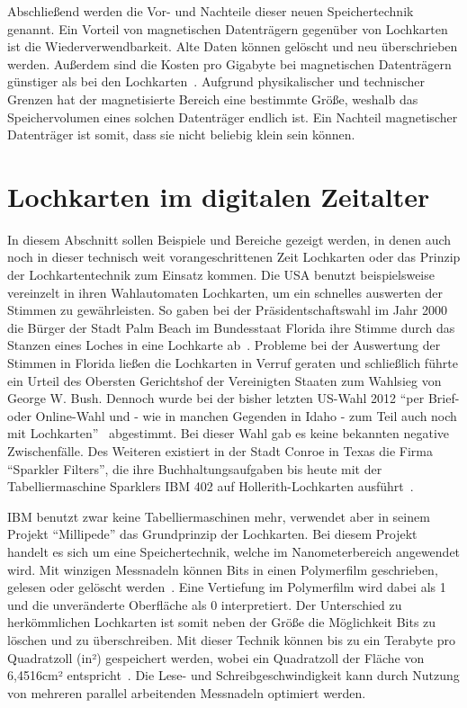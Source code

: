\documentclass[parskip=half]{scrartcl}
\begin{document}
Abschließend werden die Vor- und Nachteile dieser neuen Speichertechnik
genannt. Ein Vorteil von magnetischen Datenträgern gegenüber von Lochkarten ist
die Wiederverwendbarkeit. Alte Daten können gelöscht und neu überschrieben
werden. Außerdem sind die Kosten pro Gigabyte bei magnetischen Datenträgern
günstiger als bei den Lochkarten~\cite{Dee}. Aufgrund physikalischer und
technischer Grenzen hat der magnetisierte Bereich eine bestimmte Größe, weshalb
das Speichervolumen eines solchen Datenträger endlich ist. Ein Nachteil
magnetischer Datenträger ist somit, dass sie nicht beliebig klein sein können.

\section{Lochkarten im digitalen Zeitalter}

In diesem Abschnitt sollen Beispiele und Bereiche gezeigt werden, in denen auch
noch in dieser technisch weit vorangeschrittenen Zeit Lochkarten oder das
Prinzip der Lochkartentechnik zum Einsatz kommen. Die USA benutzt
beispielsweise vereinzelt in ihren Wahlautomaten Lochkarten, um ein schnelles
auswerten der Stimmen zu gewährleisten. So gaben bei der Präsidentschaftswahl
im Jahr 2000 die Bürger der Stadt Palm Beach im Bundesstaat Florida ihre Stimme
durch das Stanzen eines Loches in eine Lochkarte ab~\cite{simons}. Probleme bei
der Auswertung der Stimmen in Florida ließen die Lochkarten in Verruf geraten
und schließlich führte ein Urteil des Obersten Gerichtshof der Vereinigten
Staaten zum Wahlsieg von George W. Bush. Dennoch wurde bei der bisher letzten
US-Wahl 2012 \enquote{per Brief- oder Online-Wahl und - wie in manchen Gegenden
in Idaho - zum Teil auch noch mit Lochkarten}~\cite{keinVerfasser} abgestimmt.
Bei dieser Wahl gab es keine bekannten negative Zwischenfälle. Des Weiteren
existiert in der Stadt Conroe in Texas die Firma \enquote{Sparkler Filters},
die ihre Buchhaltungsaufgaben bis heute mit der Tabelliermaschine Sparklers IBM
402 auf Hollerith-Lochkarten ausführt~\cite{edwards}.

IBM benutzt zwar keine Tabelliermaschinen mehr, verwendet aber in seinem
Projekt \enquote{Millipede} das Grundprinzip der Lochkarten. Bei diesem Projekt
handelt es sich um eine Speichertechnik, welche im Nanometerbereich angewendet
wird.  Mit winzigen Messnadeln können Bits in einen Polymerfilm geschrieben,
gelesen oder gelöscht werden~\cite{binnig}. Eine Vertiefung im
Polymerfilm wird dabei als 1 und die unveränderte Oberfläche als 0
interpretiert. Der Unterschied zu herkömmlichen Lochkarten ist somit neben der
Größe die Möglichkeit Bits zu löschen und zu überschreiben. Mit dieser Technik
können bis zu ein Terabyte pro Quadratzoll (in²) gespeichert werden, wobei ein
Quadratzoll der Fläche von 6,4516cm² entspricht~\cite{binnig}. Die
Lese- und Schreibgeschwindigkeit kann durch Nutzung von mehreren parallel
arbeitenden Messnadeln optimiert werden.
\end{document}
